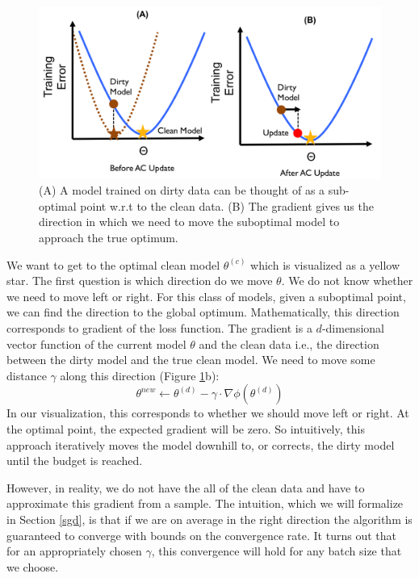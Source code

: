 \begin{figure}[ht!]
\centering
 \includegraphics[width=0.7\columnwidth]{figs/update-arch2.png}
 \caption{(A) A model trained on dirty data can be thought of as a sub-optimal point w.r.t to the clean data. (B) The gradient gives us the direction in which we need to move the suboptimal model to approach the true optimum. \label{update-arch2}}
\end{figure}

We want to get to the optimal clean model $\theta^{(c)}$ which is visualized as a yellow star.
The first question is which direction do we move $\theta$.
We do not know whether we need to move left or right.
For this class of models, given a suboptimal point, we can find the direction to 
the global optimum.
Mathematically, this direction corresponds to gradient of the loss function.
The gradient is a $d$-dimensional vector function of the current model $\theta$ and the clean data i.e., the direction between the dirty model and the true clean model.
We need to move some distance $\gamma$ along this direction (Figure \ref{update-arch2}b):
\[
\theta^{new} \leftarrow \theta^{(d)} - \gamma \cdot \nabla\phi(\theta^{(d)})
\]
In our visualization, this corresponds to whether we should move left or right.
At the optimal point, the expected gradient will be zero.
So intuitively, this approach iteratively moves the model downhill to, or corrects, the dirty model until the budget is reached.

However, in reality, we do not have the all of the clean data and have to approximate this gradient from a sample.
The intuition, which we will formalize in Section \ref{sgd}, is that if we are on average in the right direction the algorithm is guaranteed to converge with bounds on the convergence rate.
It turns out that for an appropriately chosen $\gamma$, this convergence will hold for any batch size that we choose.

